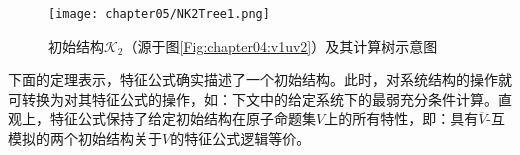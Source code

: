 \begin{example}
	
	
	\begin{figure*}
		\centering
		\texttt{[image: chapter05/NK2Tree1.png]}
		\caption{初始结构$\mathcal{K}_2$（源于图\ref{Fig:chapter04:v1uv2}）及其计算树示意图}\label{fig:K2Tree}
	\end{figure*}
	
	
\end{example}


下面的定理表示，特征公式确实描述了一个初始结构。此时，对系统结构的操作就可转换为对其特征公式的操作，如：下文中的给定系统下的最弱充分条件计算。直观上，特征公式保持了给定初始结构在原子命题集$V$上的所有特性，即：具有$\overline{V}$-互模拟的两个初始结构关于$V$的特征公式逻辑等价。

